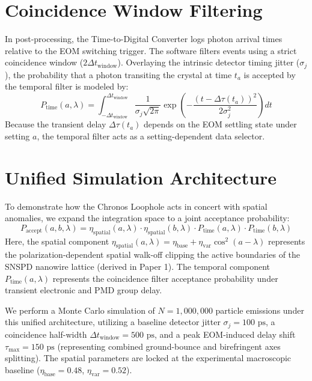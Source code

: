 \documentclass[aps,pra,reprint,superscriptaddress,amsmath,amssymb,floatfix]{revtex4-2}
\begin{document}
\section{Coincidence Window Filtering}

In post-processing, the Time-to-Digital Converter logs photon arrival times relative to the EOM switching trigger. The software filters events using a strict coincidence window ($2\Delta t_{\text{window}}$). Overlaying the intrinsic detector timing jitter ($\sigma_j$), the probability that a photon transiting the crystal at time $t_a$ is accepted by the temporal filter is modeled by:
\begin{equation}
P_{\text{time}}(a, \lambda) = \int_{-\Delta t_{\text{window}}}^{\Delta t_{\text{window}}} \frac{1}{\sigma_j \sqrt{2\pi}} \exp\left( -\frac{(t - \Delta \tau(t_a))^2}{2\sigma_j^2} \right) dt
\end{equation}
Because the transient delay $\Delta\tau(t_a)$ depends on the EOM settling state under setting $a$, the temporal filter acts as a setting-dependent data selector.

\section{Unified Simulation Architecture}

To demonstrate how the Chronos Loophole acts in concert with spatial anomalies, we expand the integration space to a joint acceptance probability:
\begin{equation}
P_{\text{accept}}(a, b, \lambda) = \eta_{\text{spatial}}(a, \lambda) \cdot \eta_{\text{spatial}}(b, \lambda) \cdot P_{\text{time}}(a, \lambda) \cdot P_{\text{time}}(b, \lambda)
\end{equation}
Here, the spatial component $\eta_{\text{spatial}}(a, \lambda) = \eta_{\text{base}} + \eta_{\text{var}}\cos^2(a-\lambda)$ represents the polarization-dependent spatial walk-off clipping the active boundaries of the SNSPD nanowire lattice (derived in Paper 1). The temporal component $P_{\text{time}}(a, \lambda)$ represents the coincidence filter acceptance probability under transient electronic and PMD group delay.

We perform a Monte Carlo simulation of $N = 1,000,000$ particle emissions under this unified architecture, utilizing a baseline detector jitter $\sigma_j = 100\text{ ps}$, a coincidence half-width $\Delta t_{\text{window}} = 500\text{ ps}$, and a peak EOM-induced delay shift $\tau_{\max} = 150\text{ ps}$ (representing combined ground-bounce and birefringent axes splitting). The spatial parameters are locked at the experimental macroscopic baseline ($\eta_{\text{base}} = 0.48$, $\eta_{\text{var}} = 0.52$).
\end{document}
